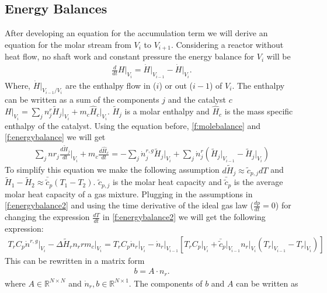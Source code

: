 \documentclass[paper=letter, fontsize=12pt]{article}
\begin{document}
\subsection{Energy Balances} \label{s:energyBalance}
After developing an equation for the accumulation term we will derive an equation for the molar stream from $V_i$ to $V_{i+1}$.  Considering a reactor without heat flow, no shaft work and constant pressure the energy balance for $V_i$ will be
\begin{align}
\frac{d}{dt} H \Big|_{V_i} = \dot{H}\Big|_{V_{i-1}} - \dot{H}\Big|_{V_{i}}. \label{f:energybalance}
\end{align}
Where, $\dot{H}\Big|_{V_{i-1}/V_i}$ are the enthalpy flow in ($i$) or out ($i-1$) of $V_i$. The enthalpy can be written as a sum of the components $j$ and the catalyst $c$ $H \Big|_{V_i}=\sum_j n^r_j \tilde{H}_j \Big|_{V_i} + m_c \hat{H}_c \Big|_{V_i}$. $\tilde{H}_j$ is a molar enthalpy and $\hat{H}_c$ is the mass specific enthalpy of the catalyst. Using the equation before, \autoref{f:molebalance} and \autoref{f:energybalance} we will get
\begin{align}
\sum_j nr_j \frac{d\tilde{H}_j}{dt} \Big|_{V_i} + m_c \frac{d\hat{H}_c}{dt}=
-\sum_j \dot{n}^{r,g}_j\tilde{H}_j \Big|_{V_i} + 
\sum_j \dot{n}^{r}_j \left( \tilde{H}_j \Big|_{V_{i-1}} - \tilde{H}_j \Big|_{V_{i}} \right) \label{f:energybalance2}
\end{align}
To simplify this equation we make the following assumption $d\tilde{H}_j \approx \tilde{c}_{p,j} dT$ and $\tilde{H}_1 - \tilde{H}_2 \approx \bar{\tilde{c}}_p \left( T_1- T_2 \right)$. $\tilde{c}_{p,j}$ is the molar heat capacity and $\bar{\tilde{c}}_p$ is the average molar heat capacity of a gas mixture. Plugging in the assumptions in \autoref{f:energybalance2} and using the time derivative of the ideal gas law ($\frac{dp}{dt}=0$) for changing the expression $\frac{dT}{dt}$ in \autoref{f:energybalance2} we will get the following expression:
\begin{align}
T_rC_p\dot{n}^{r,g} \Big|_{V_i} - \Delta \tilde{H}_r n_r r m_c \Big|_{V_i} =
T_rC_p \dot{n}_r \Big|_{V_i} - 
\dot{n}_r \Big|_{V_{i-1}}
\left[
T_rC_p \Big|_{V_i} + \bar{\tilde{c}}_p \Big|_{V_{i-1}} n_r \Big|_{V_i}
\left(
T_r\Big|_{V_{i-1}} - T_r \Big|_{V_i}
\right)
\right]
\end{align}
This can be rewritten in a matrix form
\begin{align}
b=A \cdot {n}_r.  \label{f:energyMatrix}
\end{align}
where $A \in \mathbb{R}^{N \times N}$ and $\dot{n}_r, b \in \mathbb{R}^{N \times 1}$. The components of $b$ and $A$ can be written as
\end{document}
